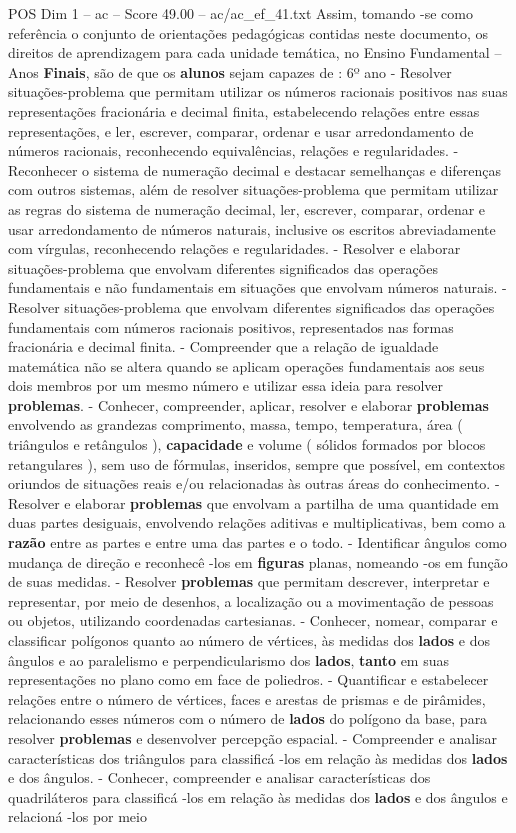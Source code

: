 \begin{textsample}{POS Dim 1 – ac – Score 49.00 – ac/ac\_ef\_41.txt}
Assim, tomando -se como referência o conjunto de orientações pedagógicas contidas neste documento, os direitos de aprendizagem para cada unidade temática, no Ensino Fundamental – Anos \textbf{Finais}, são de que os \textbf{alunos} sejam capazes de : 6º ano - Resolver situações-problema que permitam utilizar os números racionais positivos nas suas representações fracionária e decimal finita, estabelecendo relações entre essas representações, e ler, escrever, comparar, ordenar e usar arredondamento de números racionais, reconhecendo equivalências, relações e regularidades. - Reconhecer o sistema de numeração decimal e destacar semelhanças e diferenças com outros sistemas, além de resolver situações-problema que permitam utilizar as regras do sistema de numeração decimal, ler, escrever, comparar, ordenar e usar arredondamento de números naturais, inclusive os escritos abreviadamente com vírgulas, reconhecendo relações e regularidades. - Resolver e elaborar situações-problema que envolvam diferentes significados das operações fundamentais e não fundamentais em situações que envolvam números naturais. - Resolver situações-problema que envolvam diferentes significados das operações fundamentais com números racionais positivos, representados nas formas fracionária e decimal finita. - Compreender que a relação de igualdade matemática não se altera quando se aplicam operações fundamentais aos seus dois membros por um mesmo número e utilizar essa ideia para resolver \textbf{problemas}. - Conhecer, compreender, aplicar, resolver e elaborar \textbf{problemas} envolvendo as grandezas comprimento, massa, tempo, temperatura, área ( triângulos e retângulos ), \textbf{capacidade} e volume ( sólidos formados por blocos retangulares ), sem uso de fórmulas, inseridos, sempre que possível, em contextos oriundos de situações reais e/ou relacionadas às outras áreas do conhecimento. - Resolver e elaborar \textbf{problemas} que envolvam a partilha de uma quantidade em duas partes desiguais, envolvendo relações aditivas e multiplicativas, bem como a \textbf{razão} entre as partes e entre uma das partes e o todo. - Identificar ângulos como mudança de direção e reconhecê -los em \textbf{figuras} planas, nomeando -os em função de suas medidas. - Resolver \textbf{problemas} que permitam descrever, interpretar e representar, por meio de desenhos, a localização ou a movimentação de pessoas ou objetos, utilizando coordenadas cartesianas. - Conhecer, nomear, comparar e classificar polígonos quanto ao número de vértices, às medidas dos \textbf{lados} e dos ângulos e ao paralelismo e perpendicularismo dos \textbf{lados}, \textbf{tanto} em suas representações no plano como em face de poliedros. - Quantificar e estabelecer relações entre o número de vértices, faces e arestas de prismas e de pirâmides, relacionando esses números com o número de \textbf{lados} do polígono da base, para resolver \textbf{problemas} e desenvolver percepção espacial. - Compreender e analisar características dos triângulos para classificá -los em relação às medidas dos \textbf{lados} e dos ângulos. - Conhecer, compreender e analisar características dos quadriláteros para classificá -los em relação às medidas dos \textbf{lados} e dos ângulos e relacioná -los por meio 
\end{textsample}
